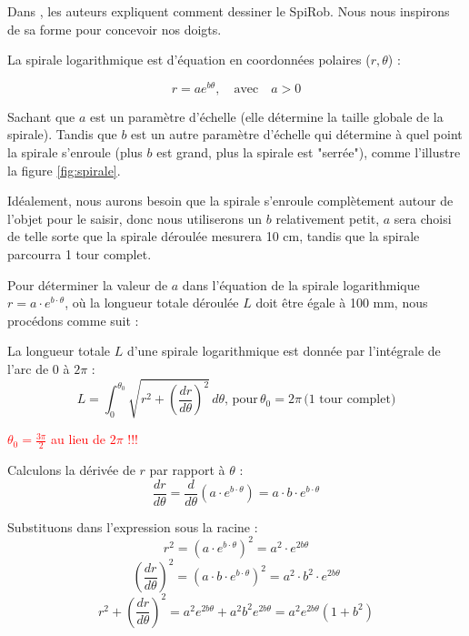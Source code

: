 \documentclass[a4paper, 11pt]{report}
\begin{document}
            Dans \cite{wang_spirobs_2025}, les auteurs expliquent comment dessiner le SpiRob. Nous nous inspirons de sa forme pour concevoir nos doigts.
        
            La spirale logarithmique est d'équation en coordonnées polaires ($r, \theta$) :

            \begin{equation}
                r = ae^{b\theta}, \quad \text{avec} \quad a > 0
                \label{eq:spirale_log}
            \end{equation}
            
            Sachant que $a$ est un paramètre d’échelle (elle détermine la taille globale de la spirale). Tandis que $b$ est un autre paramètre d’échelle qui détermine à quel point la spirale s’enroule (plus $b$ est grand, plus la spirale est "serrée"), comme l'illustre la figure \ref{fig:spirale}.
            
            Idéalement, nous aurons besoin que la spirale s'enroule complètement autour de l'objet pour le saisir, donc nous utiliserons un $b$ relativement petit, $a$ sera choisi de telle sorte que la spirale déroulée mesurera 10 cm, tandis que la spirale parcourra 1 tour complet.
        
            Pour déterminer la valeur de \( a \) dans l'équation de la spirale logarithmique \( r = a \cdot e^{b \cdot \theta} \), où la longueur totale déroulée \( L \) doit être égale à 100 mm, nous procédons comme suit :

            La longueur totale \( L \) d'une spirale logarithmique est donnée par l'intégrale de l'arc de $0$ à $2\pi$ :
            \[
            L = \int_0^{\theta_0} \sqrt{r^2 + \left(\frac{dr}{d\theta}\right)^2} \, d\theta, \, \text{pour} \, \theta_0 = 2\pi \, \text{(1 tour complet)}
            \]

            \textcolor{red}{$\theta_0 = \frac{3\pi}{2}$ au lieu de $2\pi$ !!!}
            
            Calculons la dérivée de \( r \) par rapport à \( \theta \) :
            \[
            \frac{dr}{d\theta} = \frac{d}{d\theta} \left( a \cdot e^{b \cdot \theta} \right) = a \cdot b \cdot e^{b \cdot \theta}
            \]
            
            Substituons dans l'expression sous la racine :
            \[
            r^2 = \left( a \cdot e^{b \cdot \theta} \right)^2 = a^2 \cdot e^{2b \theta}
            \]
            \[
            \left( \frac{dr}{d\theta} \right)^2 = \left( a \cdot b \cdot e^{b \cdot \theta} \right)^2 = a^2 \cdot b^2 \cdot e^{2b \theta}
            \]
            \[
            r^2 + \left( \frac{dr}{d\theta} \right)^2 = a^2 e^{2b \theta} + a^2 b^2 e^{2b \theta} = a^2 e^{2b \theta} (1 + b^2)
            \]
            
\end{document}
